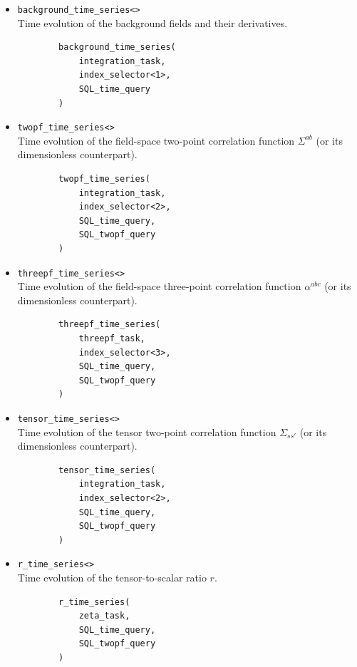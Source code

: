 \documentclass[11pt,a4paper]{article}
\begin{document}
\begin{itemize}
    \item \texttt{background_time_series<>} \\
    Time evolution of the background fields and their derivatives.
    \begin{verbatim}
        background_time_series(
            integration_task,
            index_selector<1>,
            SQL_time_query
        )
    \end{verbatim}
    
    \item \texttt{twopf_time_series<>} \\
    Time evolution of the field-space two-point correlation function $\Sigma^{ab}$
    (or its dimensionless counterpart).
    \begin{verbatim}
        twopf_time_series(
            integration_task,
            index_selector<2>,
            SQL_time_query,
            SQL_twopf_query
        )
    \end{verbatim}
    
    \item \texttt{threepf_time_series<>} \\
    Time evolution of the field-space three-point correlation function $\alpha^{abc}$
    (or its dimensionless counterpart).
    \begin{verbatim}
        threepf_time_series(
            threepf_task,
            index_selector<3>,
            SQL_time_query,
            SQL_twopf_query
        )    
    \end{verbatim}

    \item \texttt{tensor_time_series<>} \\
    Time evolution of the tensor
    two-point correlation function $\Sigma_{ss'}$
    (or its dimensionless counterpart).
    \begin{verbatim}
        tensor_time_series(
            integration_task,
            index_selector<2>,
            SQL_time_query,
            SQL_twopf_query
        )
    \end{verbatim}
    
    \item \texttt{r_time_series<>} \\
    Time evolution of the tensor-to-scalar ratio $r$.
    \begin{verbatim}
        r_time_series(
            zeta_task,
            SQL_time_query,
            SQL_twopf_query
        )
    \end{verbatim}


\end{itemize}
\end{document}
